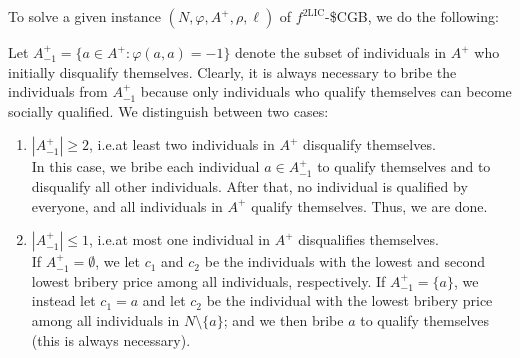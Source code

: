 \documentclass[
    12pt,               %
    a4paper,            %
    bibtotoc,           %
    pointlessnumbers,   %
    ngerman,            %
    titlepage,          %
    leqno,              %
    ]{scrarticle}       %
\begin{document}
\begin{Proof}
To solve a given instance $(N, \varphi, A^+, \rho, \ell)$ of $f^{\text{2LIC}}$-\$CGB, we do the following:

Let $A^+_{-1} = \{ a \in A^+ : \varphi(a, a) = -1 \}$ denote the subset of individuals in $A^+$ who initially disqualify themselves. Clearly, it is always necessary to bribe the individuals from $A^+_{-1}$ because only individuals who qualify themselves can become socially qualified. We distinguish between two cases:

\begin{enumerate}[
    leftmargin=*,
    label={\textit{Case \ref*{thm:2lic_cgb_p}.\arabic*}:}
]
\item
$|A^+_{-1}| \geq 2$, i.e.\@ at least two individuals in $A^+$ disqualify themselves. \\
In this case, we bribe each individual $a \in A^+_{-1}$ to qualify themselves and to disqualify all other individuals. After that, no individual is qualified by everyone, and all individuals in $A^+$ qualify themselves. Thus, we are done.

\item
$|A^+_{-1}| \leq 1$, i.e.\@ at most one individual in $A^+$ disqualifies themselves. \\
If $A^+_{-1} = \emptyset$, we let $c_1$ and $c_2$ be the individuals with the lowest and second lowest bribery price among all individuals, respectively. If $A^+_{-1} = \{a\}$, we instead let $c_1 = a$ and let $c_2$ be the individual with the lowest bribery price among all individuals in $N \setminus \{a\}$; and we then bribe $a$ to qualify themselves (this is always necessary).


\end{enumerate}
\end{Proof}
\end{document}
